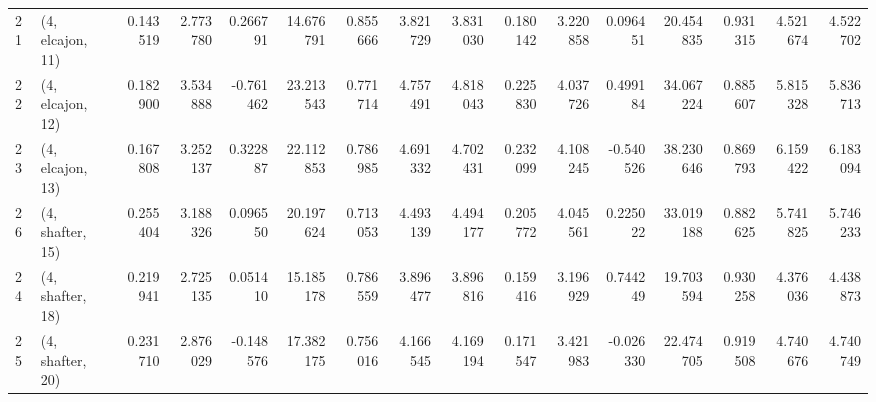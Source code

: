 \begin{tabular}{llrrrrrrrrrrrrrr}
21 &  (4, elcajon, 11) &   0.143519 &  2.773780 &  0.266791 &  14.676791 &  0.855666 &   3.821729 &  3.831030 &  0.180142 &  3.220858 &  0.096451 &   20.454835 &  0.931315 &   4.521674 &   4.522702 \\
22 &  (4, elcajon, 12) &   0.182900 &  3.534888 & -0.761462 &  23.213543 &  0.771714 &   4.757491 &  4.818043 &  0.225830 &  4.037726 &  0.499184 &   34.067224 &  0.885607 &   5.815328 &   5.836713 \\
23 &  (4, elcajon, 13) &   0.167808 &  3.252137 &  0.322887 &  22.112853 &  0.786985 &   4.691332 &  4.702431 &  0.232099 &  4.108245 & -0.540526 &   38.230646 &  0.869793 &   6.159422 &   6.183094 \\
26 &  (4, shafter, 15) &   0.255404 &  3.188326 &  0.096550 &  20.197624 &  0.713053 &   4.493139 &  4.494177 &  0.205772 &  4.045561 &  0.225022 &   33.019188 &  0.882625 &   5.741825 &   5.746233 \\
24 &  (4, shafter, 18) &   0.219941 &  2.725135 &  0.051410 &  15.185178 &  0.786559 &   3.896477 &  3.896816 &  0.159416 &  3.196929 &  0.744249 &   19.703594 &  0.930258 &   4.376036 &   4.438873 \\
25 &  (4, shafter, 20) &   0.231710 &  2.876029 & -0.148576 &  17.382175 &  0.756016 &   4.166545 &  4.169194 &  0.171547 &  3.421983 & -0.026330 &   22.474705 &  0.919508 &   4.740676 &   4.740749 \\
\bottomrule
\end{tabular}
